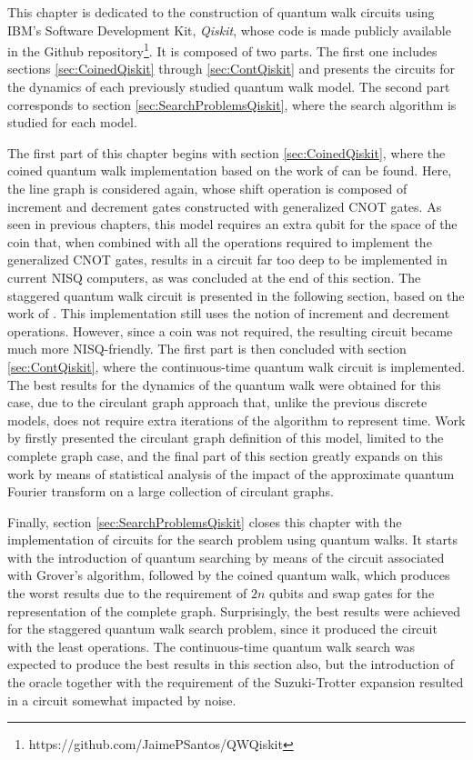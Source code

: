 \documentclass[../../dissertation.tex]{subfiles}
\begin{document}
This chapter is dedicated to the construction of quantum walk circuits using
IBM's Software Development Kit, \textit{Qiskit}, whose code is made publicly available in the
Github repository\footnote{https://github.com/JaimePSantos/QWQiskit}. It is
composed of two parts. The first one includes sections \ref{sec:CoinedQiskit}
through \ref{sec:ContQiskit} and presents the circuits for the dynamics of each
previously studied quantum walk model. The second part corresponds to section
\ref{sec:SearchProblemsQiskit}, where the search algorithm is studied for each
model.\par 

The first part of this chapter begins with section \ref{sec:CoinedQiskit},
where the coined quantum walk implementation based on the work of
\cite{douglaswang07} can be found. Here, the line graph is considered again,
whose shift operation is composed of increment and decrement gates constructed
with generalized CNOT gates. As seen in previous chapters, this model
requires an extra qubit for the space of the coin that, when combined with all
the operations required to implement the generalized CNOT gates, results in a
circuit far too deep to be implemented in current NISQ computers, as was
concluded at the end of this section. The staggered quantum walk circuit is
presented in the following section, based on the work of \cite{acasiete2020}.
This implementation still uses the notion of increment and decrement
operations. However, since a coin was not required, the resulting circuit
became much more NISQ-friendly. The first part is then concluded with section
\ref{sec:ContQiskit}, where the continuous-time quantum walk circuit is
implemented. The best results for the dynamics of the quantum walk were
obtained for this case, due to the circulant graph approach that, unlike the
previous discrete models, does not require extra iterations of the algorithm to
represent time. Work by \cite{qiang2016} firstly presented the circulant graph
definition of this model, limited to the complete graph case, and the final part
of this section greatly expands on this work by means of statistical analysis
of the impact of the approximate quantum Fourier transform on a large
collection of circulant graphs.\par

Finally, section \ref{sec:SearchProblemsQiskit} closes this chapter with the
implementation of circuits for the search problem using quantum walks. It
starts with the introduction of quantum searching by means of the circuit
associated with Grover's algorithm, followed by the coined quantum walk, which
produces the worst results due to the requirement of $2n$ qubits and swap gates
for the representation of the complete graph. Surprisingly, the best results
were achieved for the staggered quantum walk search problem, since it produced
the circuit with the least operations. The continuous-time quantum walk search
was expected to produce the best results in this section also, but the
introduction of the oracle together with the requirement of the Suzuki-Trotter
expansion resulted in a circuit somewhat impacted by noise.
\end{document}
